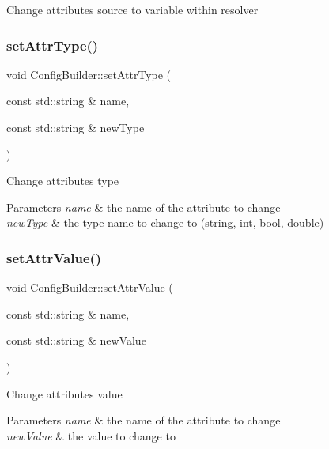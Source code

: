 Change attribute\textquotesingle{}s source to variable within resolver \mbox{\label{classtheoria_1_1config_1_1ConfigBuilder_a019902280637cd43d9a69acb678a5967}} 
\subsubsection{\texorpdfstring{set\+Attr\+Type()}{setAttrType()}}
{\footnotesize\ttfamily void Config\+Builder\+::set\+Attr\+Type (\begin{DoxyParamCaption}\item[{const std\+::string \&}]{name,  }\item[{const std\+::string \&}]{new\+Type }\end{DoxyParamCaption})}

Change attributes type 
\begin{DoxyParams}{Parameters}
{\em name} & the name of the attribute to change \\
\hline
{\em new\+Type} & the type name to change to (string, int, bool, double) \\
\hline
\end{DoxyParams}
\mbox{\label{classtheoria_1_1config_1_1ConfigBuilder_adcdd668ab4958497e7328b02ad8f8f83}} 
\subsubsection{\texorpdfstring{set\+Attr\+Value()}{setAttrValue()}}
{\footnotesize\ttfamily void Config\+Builder\+::set\+Attr\+Value (\begin{DoxyParamCaption}\item[{const std\+::string \&}]{name,  }\item[{const std\+::string \&}]{new\+Value }\end{DoxyParamCaption})}

Change attributes value 
\begin{DoxyParams}{Parameters}
{\em name} & the name of the attribute to change \\
\hline
{\em new\+Value} & the value to change to \\
\hline
\end{DoxyParams}
\mbox{\label{classtheoria_1_1config_1_1ConfigBuilder_a7aa67220439e90e9fa59082355c8186f}} 
